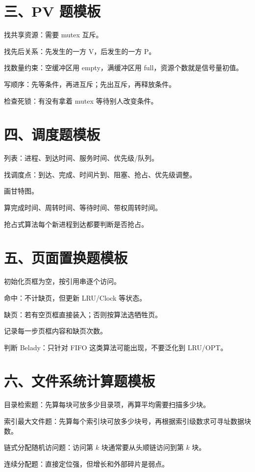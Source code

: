\documentclass[UTF8,openany,zihao=-4]{ctexbook}
\begin{document}
\section*{三、PV 题模板}
\begin{points}
  \item 找共享资源：需要 mutex 互斥。
  \item 找先后关系：先发生的一方 V，后发生的一方 P。
  \item 找数量约束：空缓冲区用 empty，满缓冲区用 full，资源个数就是信号量初值。
  \item 写顺序：先等条件，再进互斥；先出互斥，再释放条件。
  \item 检查死锁：有没有拿着 mutex 等待别人改变条件。
\end{points}

\section*{四、调度题模板}
\begin{points}
  \item 列表：进程、到达时间、服务时间、优先级/队列。
  \item 找调度点：到达、完成、时间片到、阻塞、抢占、优先级调整。
  \item 画甘特图。
  \item 算完成时间、周转时间、等待时间、带权周转时间。
  \item 抢占式算法每个新进程到达都要判断是否抢占。
\end{points}

\section*{五、页面置换题模板}
\begin{points}
  \item 初始化页框为空，按引用串逐个访问。
  \item 命中：不计缺页，但更新 LRU/Clock 等状态。
  \item 缺页：若有空页框直接装入；否则按算法选牺牲页。
  \item 记录每一步页框内容和缺页次数。
  \item 判断 Belady：只针对 FIFO 这类算法可能出现，不要泛化到 LRU/OPT。
\end{points}

\section*{六、文件系统计算题模板}
\begin{points}
  \item 目录检索题：先算每块可放多少目录项，再算平均需要扫描多少块。
  \item 索引最大文件题：先算每个索引块可放多少块号，再根据索引级数求可寻址数据块数。
  \item 链式分配随机访问题：访问第 $k$ 块通常要从头顺链访问到第 $k$ 块。
  \item 连续分配题：直接定位强，但增长和外部碎片是弱点。
\end{points}
\end{document}
